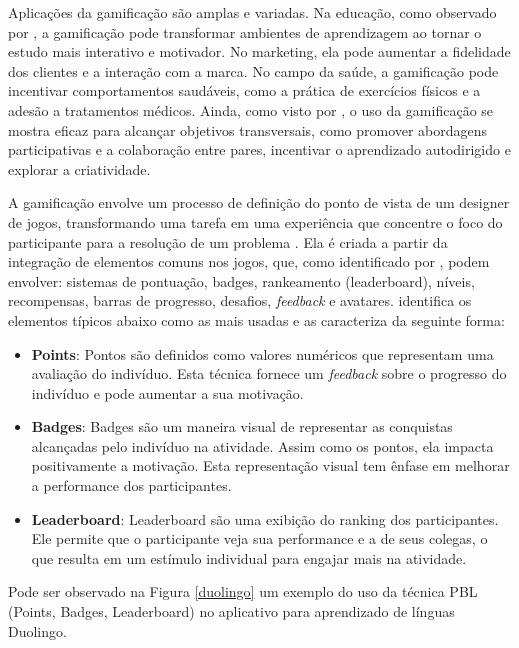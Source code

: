 \documentclass[
	12pt,
	openright,
	twoside,
	a4paper,
	english,
	brazil
	]{abntex2}
\begin{document}
Aplicações da gamificação são amplas e variadas. Na educação, como observado por , a gamificação pode transformar ambientes de aprendizagem ao tornar o estudo mais interativo e motivador. No marketing, ela pode aumentar a fidelidade dos clientes e a interação com a marca. No campo da saúde, a gamificação pode incentivar comportamentos saudáveis, como a prática de exercícios físicos e a adesão a tratamentos médicos. Ainda, como visto por , o uso da gamificação se mostra eficaz para alcançar objetivos transversais, como promover abordagens participativas e a colaboração entre pares, incentivar o aprendizado autodirigido e explorar a criatividade.

A gamificação envolve um processo de definição do ponto de vista de um designer de jogos, transformando uma tarefa em uma experiência que concentre o foco do participante para a resolução de um problema \cite{Fardo_2013}. Ela é criada a partir da integração de elementos comuns nos jogos, que, como identificado por , podem envolver: sistemas de pontuação, badges, rankeamento (leaderboard), níveis, recompensas, barras de progresso, desafios, \textit{feedback} e avatares.  identifica os elementos típicos abaixo como as mais usadas e as caracteriza da seguinte forma:
\begin{itemize}
  \item \textbf{Points}: Pontos são definidos como valores numéricos que representam uma avaliação do indivíduo. Esta técnica fornece um \textit{feedback} sobre o progresso do indivíduo e pode aumentar a sua motivação.

  \item \textbf{Badges}: Badges são um maneira visual de representar as conquistas alcançadas pelo indivíduo na atividade. Assim como os pontos, ela impacta positivamente a motivação. Esta representação visual tem ênfase em melhorar a performance dos participantes.

  \item \textbf{Leaderboard}: Leaderboard são uma exibição do ranking dos participantes. Ele permite que o participante veja sua performance e a de seus colegas, o que resulta em um estímulo individual para engajar mais na atividade.
\end{itemize}

Pode ser observado na Figura \ref{duolingo} um exemplo do uso da técnica PBL (Points, Badges, Leaderboard) no aplicativo para aprendizado de línguas Duolingo.
\end{document}
